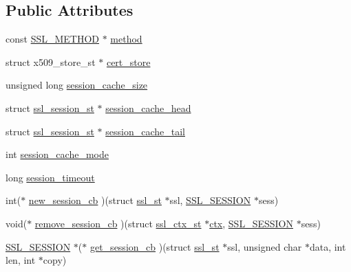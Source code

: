 \subsection*{Public Attributes}
\begin{DoxyCompactItemize}
\item 
const \hyperlink{ssl_8h_a74d54b9a714accac31c73bfb55973e81}{S\-S\-L\-\_\-\-M\-E\-T\-H\-O\-D} $\ast$ \hyperlink{structssl__ctx__st_a9e4773d3ec5b1a80abab92390015c576}{method}
\item 
struct x509\-\_\-store\-\_\-st $\ast$ \hyperlink{structssl__ctx__st_a8b6658b3bc3acb20908f2541056e3949}{cert\-\_\-store}
\item 
unsigned long \hyperlink{structssl__ctx__st_af715c6f8caa8c192423ad5abfa211e6e}{session\-\_\-cache\-\_\-size}
\item 
struct \hyperlink{structssl__session__st}{ssl\-\_\-session\-\_\-st} $\ast$ \hyperlink{structssl__ctx__st_a3683adb75792a407eee86f042a7c7c68}{session\-\_\-cache\-\_\-head}
\item 
struct \hyperlink{structssl__session__st}{ssl\-\_\-session\-\_\-st} $\ast$ \hyperlink{structssl__ctx__st_a1524f4319d24d011a575b8e9a70a0065}{session\-\_\-cache\-\_\-tail}
\item 
int \hyperlink{structssl__ctx__st_a957af083f0d87b4347e29788bd7e00e5}{session\-\_\-cache\-\_\-mode}
\item 
long \hyperlink{structssl__ctx__st_a7b165f0e9fbde0499dedb660cdf0d756}{session\-\_\-timeout}
\item 
int($\ast$ \hyperlink{structssl__ctx__st_ad25375ee230e8a9dafda44d9c9bcb102}{new\-\_\-session\-\_\-cb} )(struct \hyperlink{structssl__st}{ssl\-\_\-st} $\ast$ssl, \hyperlink{ssl_8h_a8dd6b81bbcb1b2d769235c37779d2a94}{S\-S\-L\-\_\-\-S\-E\-S\-S\-I\-O\-N} $\ast$sess)
\item 
void($\ast$ \hyperlink{structssl__ctx__st_a82fef836aeedd6eabb09c4443f8897de}{remove\-\_\-session\-\_\-cb} )(struct \hyperlink{structssl__ctx__st}{ssl\-\_\-ctx\-\_\-st} $\ast$\hyperlink{client_8c_ad5433bcc8a463fb4df3ce5912bb11fe3}{ctx}, \hyperlink{ssl_8h_a8dd6b81bbcb1b2d769235c37779d2a94}{S\-S\-L\-\_\-\-S\-E\-S\-S\-I\-O\-N} $\ast$sess)
\item 
\hyperlink{ssl_8h_a8dd6b81bbcb1b2d769235c37779d2a94}{S\-S\-L\-\_\-\-S\-E\-S\-S\-I\-O\-N} $\ast$($\ast$ \hyperlink{structssl__ctx__st_a5c21087395cba272416cde57785ba09b}{get\-\_\-session\-\_\-cb} )(struct \hyperlink{structssl__st}{ssl\-\_\-st} $\ast$ssl, unsigned char $\ast$data, int len, int $\ast$copy)
\item 

\end{DoxyCompactItemize}
